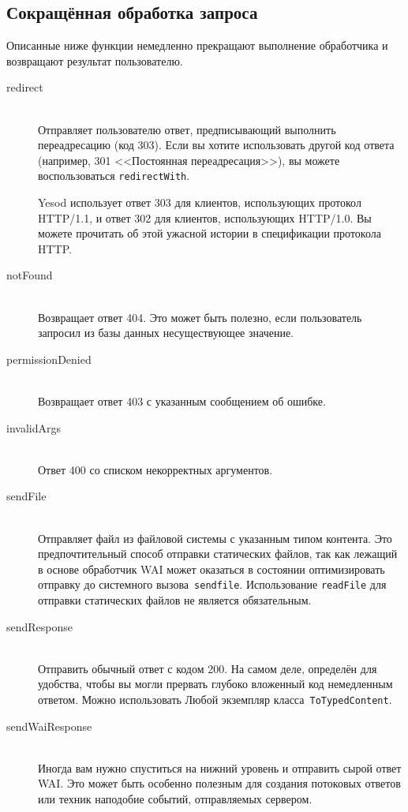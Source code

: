 \subsection{Сокращённая обработка запроса}
Описанные ниже функции немедленно прекращают выполнение обработчика и
возвращают результат пользователю.
\begin{description}
\item[redirect] \hfill \\
  Отправляет пользователю ответ, предписывающий выполнить переадресацию (код 303). Если вы
  хотите использовать другой код ответа (например, 301 <<Постоянная переадресация>>), вы
  можете воспользоваться \lstinline!redirectWith!.

\begin{remark}
Yesod использует ответ 303 для клиентов, использующих протокол HTTP/1.1, и ответ
302 для клиентов, использующих HTTP/1.0. Вы можете прочитать об этой
ужасной истории в спецификации протокола HTTP.
\end{remark}

\item[notFound] \hfill \\
Возвращает ответ 404. Это может быть полезно, если пользователь
запросил из базы данных несуществующее значение.

\item[permissionDenied] \hfill \\
Возвращает ответ 403 с указанным сообщением об ошибке.

\item[invalidArgs] \hfill \\
Ответ 400 со списком некорректных аргументов.

\item[sendFile] \hfill \\
Отправляет файл из файловой системы с указанным типом контента. Это
предпочтительный способ отправки статических файлов, так как лежащий
в основе обработчик WAI может оказаться в состоянии оптимизировать
отправку до системного вызова~\texttt{sendfile}. Использование
\lstinline!readFile! для отправки статических файлов не является
обязательным.

\item[sendResponse] \hfill \\
Отправить обычный ответ с кодом 200. На самом
деле, определён для удобства, чтобы вы могли прервать глубоко
вложенный код немедленным ответом. Можно использовать Любой экземпляр
класса~\lstinline'ToTypedContent'.

\item[sendWaiResponse] \hfill \\
Иногда вам нужно спуститься на нижний уровень и отправить сырой ответ
WAI. Это может быть особенно полезным для создания потоковых ответов
или техник наподобие событий, отправляемых сервером.
\end{description}

